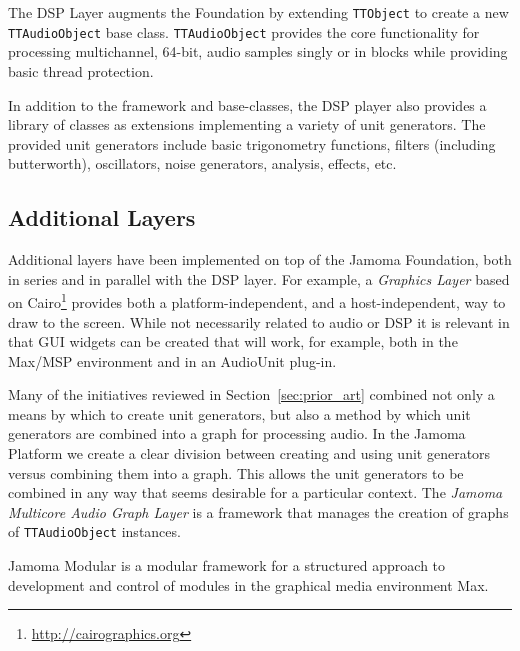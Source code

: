 \documentclass[twoside,10pt]{article}
\begin{document}
The DSP Layer augments the Foundation by extending \texttt{TTObject} to create a new \texttt{TTAudioObject} base class.  \texttt{TTAudioObject} provides the core functionality for processing multichannel, 64-bit, audio samples singly or in blocks while providing basic thread protection.

In addition to the framework and base-classes, the DSP player also provides a library of classes as extensions implementing a variety of unit generators.  The provided unit generators include basic trigonometry functions, filters (including butterworth), oscillators, noise generators, analysis, effects, etc.




\subsection{Additional Layers} %

Additional layers have been implemented on top of the Jamoma Foundation, both in series and in parallel with the DSP layer.  For example, a \emph{Graphics Layer} based on Cairo\footnote{\url{http://cairographics.org}} provides both a platform-independent, and a host-independent, way to draw to the screen.  While not necessarily related to audio or DSP it is relevant in that GUI widgets can be created that will work, for example, both in the Max/MSP environment and in an AudioUnit plug-in.


Many of the initiatives reviewed in Section~\ref{sec:prior_art} combined not only a means by which to create unit generators, but also a method by which unit generators are combined into a graph for processing audio.  In the Jamoma Platform we create a clear division between creating and using unit generators versus combining them into a graph.  This allows the unit generators to be combined in any way that seems desirable for a particular context.  The \emph{Jamoma Multicore Audio Graph Layer} is a framework that manages the creation of graphs of \texttt{TTAudioObject} instances.


Jamoma Modular is a modular framework for a structured approach to development and control of modules in the graphical media environment Max.

\end{document}
